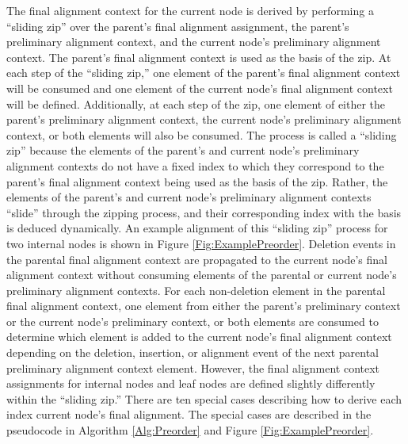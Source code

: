 \documentclass[11pt]{article}
\begin{document}
The final alignment context for the current node is derived by performing a ``sliding zip'' over the parent's final alignment assignment, the parent's preliminary alignment context, and the current node's preliminary alignment context.
The parent's final alignment context is used as the basis of the zip.
At each step of the ``sliding zip,'' one element of the parent's final alignment context will be consumed and one element of the current node's final alignment context will be defined.
Additionally, at each step of the zip, one element of either the parent's preliminary alignment context, the current node's preliminary alignment context, or both elements will also be consumed.
The process is called a ``sliding zip'' because the elements of the parent's and current node's preliminary alignment contexts do not have a fixed index to which they correspond to the parent's final alignment context being used as the basis of the zip.
Rather, the elements of the parent's and current node's preliminary alignment contexts ``slide'' through the zipping process, and their corresponding index with the basis is deduced dynamically.
An example alignment of this ``sliding zip'' process for two internal  nodes is shown in Figure \ref{Fig:ExamplePreorder}.
Deletion events in the parental final alignment context are propagated to the current node's final alignment context without consuming elements of the parental or current node's preliminary alignment contexts.
For each non-deletion element in the parental final alignment context, one element from either the parent's preliminary context or the current node's preliminary context, or both elements are consumed to determine which element is added to the current node's final alignment context depending on the deletion, insertion, or alignment event of the next parental preliminary alignment context element.
However, the final alignment context assignments for internal nodes and leaf nodes are defined slightly differently within the ``sliding zip.''
There are ten special cases describing how to derive each index current node's final alignment. The special cases are described in the pseudocode in Algorithm \ref{Alg:Preorder} and Figure \ref{Fig:ExamplePreorder}.
\end{document}
